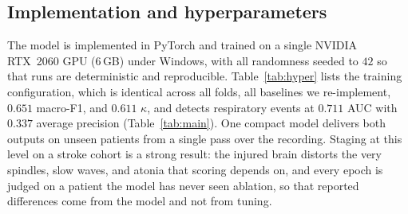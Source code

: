 \documentclass[journal]{IEEEtran}
\newcommand{\mmMf}{0.651}
\newcommand{\mmK}{0.611}
\newcommand{\mmAuc}{0.711}
\newcommand{\mmAp}{0.337}
\providecommand{\DIFaddtex}[1]{{\protect\color{blue} \sf #1}} %
\providecommand{\DIFdeltex}[1]{{\protect\color{red} \scriptsize #1}} %
\providecommand{\DIFaddbegin}{} %
\providecommand{\DIFaddend}{} %
\providecommand{\DIFdelbegin}{} %
\providecommand{\DIFdelend}{} %
\providecommand{\DIFadd}[1]{\texorpdfstring{\DIFaddtex{#1}}{#1}} %
\providecommand{\DIFdel}[1]{\texorpdfstring{\DIFdeltex{#1}}{}} %
\providecommand{\DIFscaledelfig}{0.5}
\newlength{\DIFdelgraphicswidth} %
\newlength{\DIFdelgraphicsheight} %
\providecommand{\DIFaddincludegraphics}[2][]{{\color{blue}\fbox{\DIFOincludegraphics[#1]{#2}}}} %
\providecommand{\DIFdelincludegraphics}[2][]{%
\sbox{\DIFdelgraphicsbox}{\DIFOincludegraphics[#1]{#2}}%
\settoboxwidth{\DIFdelgraphicswidth}{\DIFdelgraphicsbox} %
\settoboxtotalheight{\DIFdelgraphicsheight}{\DIFdelgraphicsbox} %
\scalebox{\DIFscaledelfig}{%
\parbox[b]{\DIFdelgraphicswidth}{\usebox{\DIFdelgraphicsbox}\\[-\baselineskip] \rule{\DIFdelgraphicswidth}{0em}}\llap{\resizebox{\DIFdelgraphicswidth}{\DIFdelgraphicsheight}{%
\setlength{\unitlength}{\DIFdelgraphicswidth}%
\begin{picture}(1,1)%
\thicklines\linethickness{2pt} %
{\color[rgb]{1,0,0}\put(0,0){\framebox(1,1){}}}%
{\color[rgb]{1,0,0}\put(0,0){\line( 1,1){1}}}%
{\color[rgb]{1,0,0}\put(0,1){\line(1,-1){1}}}%
\end{picture}%
}\hspace*{3pt}}} %
} %
\DeclareRobustCommand{\DIFaddbegin}{\DIFOaddbegin \let\includegraphics\DIFaddincludegraphics} %
\DeclareRobustCommand{\DIFaddend}{\DIFOaddend \let\includegraphics\DIFOincludegraphics} %
\DeclareRobustCommand{\DIFdelbegin}{\DIFOdelbegin \let\includegraphics\DIFdelincludegraphics} %
\DeclareRobustCommand{\DIFdelend}{\DIFOaddend \let\includegraphics\DIFOincludegraphics} %
\begin{document}
\subsection{\DIFadd{Implementation and hyperparameters}}
\DIFadd{The model is implemented in PyTorch and trained on a single NVIDIA RTX~2060 GPU (6\,GB) under
Windows, with all randomness seeded to $42$ so that runs are deterministic and reproducible.
Table~\ref{tab:hyper} lists the training configuration, which is identical across all folds, all
baselines we re-implement}\DIFaddend , \DIFdelbegin \DIFdel{$\mmMf$ macro-F1, }\DIFdelend and \DIFdelbegin \DIFdel{$\mmK$ $\kappa$,
and detects
respiratory events at $\mmAuc$ AUC with $\mmAp$ average precision (Table~\ref{tab:main}). One
compact model delivers both outputs on unseen patients from a single pass over the recording.
Staging at this level on a stroke cohort is a strong result: the injured brain distorts the
very spindles, slow waves, and atonia that scoring depends on, and }\DIFdelend every \DIFdelbegin \DIFdel{epoch is judged on a
patient the model
has never seen}\DIFdelend \DIFaddbegin \DIFadd{ablation, so that reported differences come from the model
and not from tuning}\DIFaddend .
\end{document}
